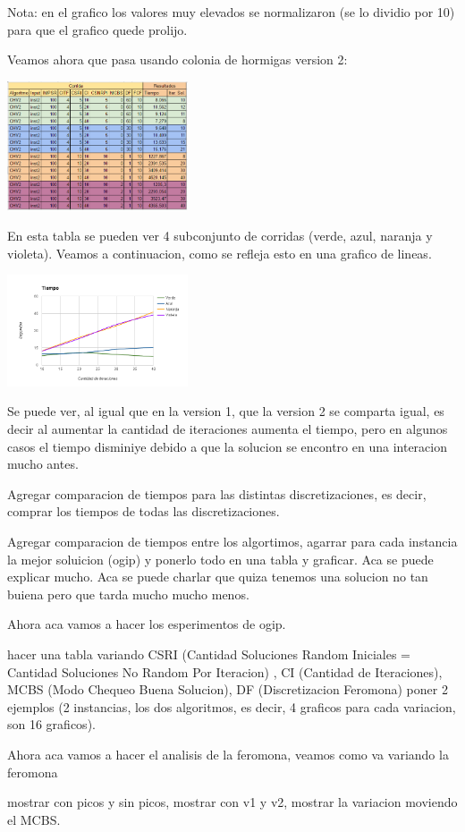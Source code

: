 Nota: en el grafico los valores muy elevados se normalizaron (se lo dividio por 10) para que el grafico quede prolijo.

Veamos ahora que pasa usando colonia de hormigas version 2:

\begin{center}
\includegraphics[width=0.4\textwidth]{imagenes/tabla4}
\end{center}

En esta tabla se pueden ver 4 subconjunto de corridas (verde, azul, naranja y violeta). Veamos a continuacion, como se refleja esto en una grafico de lineas.

\begin{center}
\includegraphics[width=0.4\textwidth]{imagenes/grafico2}
\end{center}

Se puede ver, al igual que en la version 1, que la version 2 se comparta igual, es decir al aumentar la cantidad de iteraciones aumenta el tiempo, pero en algunos casos el tiempo disminiye debido a que la solucion se encontro en una interacion mucho antes.




Agregar comparacion de tiempos para las distintas discretizaciones, es decir, comprar los tiempos de todas las discretizaciones. 



Agregar comparacion de tiempos entre los algortimos, agarrar para cada instancia la mejor soluicion (ogip) y ponerlo todo en una tabla y graficar. Aca se puede explicar mucho. 
Aca se puede charlar que quiza tenemos una solucion no tan buiena pero que tarda mucho mucho menos.


Ahora aca vamos a hacer los esperimentos de ogip.

hacer una tabla variando
CSRI (Cantidad Soluciones Random Iniciales = Cantidad Soluciones No Random Por Iteracion) , CI (Cantidad de Iteraciones), MCBS (Modo Chequeo Buena Solucion), DF (Discretizacion Feromona)
poner 2 ejemplos (2 instancias, los dos algoritmos, es decir, 4 graficos para cada variacion, son 16 graficos).

Ahora aca vamos a hacer el analisis de la feromona, veamos como va variando la feromona

mostrar con picos y sin picos, mostrar con v1 y v2, mostrar la variacion moviendo el MCBS.


